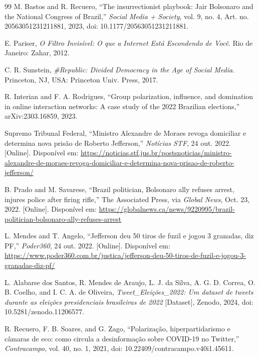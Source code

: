 \documentclass[12pt,a4paper,oneside]{article}
\begin{document}
\begin{thebibliography}{99}
\singlespacing
{} M. Bastos and R. Recuero, ``The insurrectionist playbook: Jair Bolsonaro and the National Congress of Brazil,'' \emph{Social Media + Society}, vol. 9, no. 4, Art. no. 20563051231211881, 2023, doi: 10.1177/20563051231211881.

 E. Pariser, \emph{O Filtro Invisível: O que a Internet Está Escondendo de Você}. Rio de Janeiro: Zahar, 2012.

 C. R. Sunstein, \emph{\#Republic: Divided Democracy in the Age of Social Media}. Princeton, NJ, USA: Princeton Univ. Press, 2017.

 R. Interian and F. A. Rodrigues, ``Group polarization, influence, and domination in online interaction networks: A case study of the 2022 Brazilian elections,'' arXiv:2303.16859, 2023.

 Supremo Tribunal Federal, ``Ministro Alexandre de Moraes revoga domiciliar e determina nova prisão de Roberto Jefferson,'' \emph{Notícias STF}, 24 out. 2022. [Online]. Disponível em: \url{https://noticias.stf.jus.br/postsnoticias/ministro-alexandre-de-moraes-revoga-domiciliar-e-determina-nova-prisao-de-roberto-jefferson/}

 B. Prado and M. Savarese, ``Brazil politician, Bolsonaro ally refuses arrest, injures police after firing rifle,'' The Associated Press, via \emph{Global News}, Oct. 23, 2022. [Online]. Disponível em: \url{https://globalnews.ca/news/9220995/brazil-politician-bolsonaro-ally-refuses-arrest}

 L. Mendes and T. Angelo, ``Jefferson deu 50 tiros de fuzil e jogou 3 granadas, diz PF,'' \emph{Poder360}, 24 out. 2022. [Online]. Disponível em: \url{https://www.poder360.com.br/justica/jefferson-deu-50-tiros-de-fuzil-e-jogou-3-granadas-diz-pf/}

 L. Alabarse dos Santos, R. Mendes de Araujo, L. J. da Silva, A. G. D. Correa, O. B. Coelho, and I. C. A. de Oliveira, \emph{Tweet\_Eleições\_2022: Um dataset de tweets durante as eleições presidenciais brasileiras de 2022} [Dataset], Zenodo, 2024, doi: 10.5281/zenodo.11206577.

 R. Recuero, F. B. Soares, and G. Zago, ``Polarização, hiperpartidarismo e câmaras de eco: como circula a desinformação sobre COVID-19 no Twitter,'' \emph{Contracampo}, vol. 40, no. 1, 2021, doi: 10.22409/contracampo.v40i1.45611.


\end{thebibliography}
\end{document}
